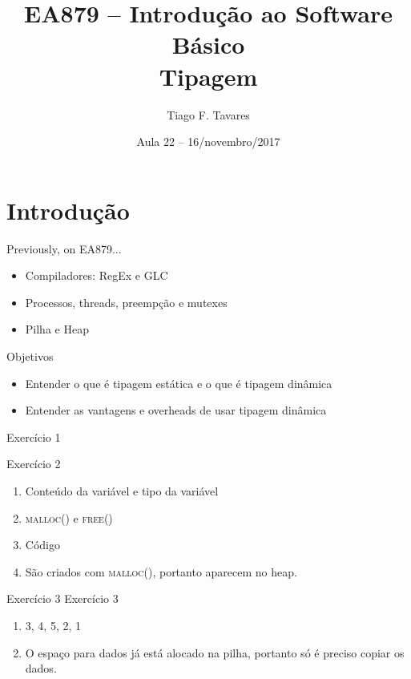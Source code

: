 \documentclass{beamer}
\title[22-Tipagem]{EA879 -- Introdução ao Software
Básico\\Tipagem}
\author{Tiago F. Tavares}
\institute{FEEC -- UNICAMP}
\date{Aula 22 -- 16/novembro/2017}
\begin{document}
\begin{frame}
  \titlepage
\end{frame}


\section{Introdução}

\begin{frame}[fragile]{Previously, on EA879...}
  \centering
  \Large
  \begin{itemize}
    \item Compiladores: RegEx e GLC
    \item Processos, threads, preempção e mutexes
    \item Pilha e Heap
  \end{itemize}
\end{frame}

\begin{frame}{Objetivos}
  \Large
  \begin{itemize}
    \item Entender o que é tipagem estática e o que é tipagem dinâmica
    \item Entender as vantagens e overheads de usar tipagem dinâmica
  \end{itemize}
\end{frame}



\begin{frame}[fragile]{Exercício 1}
  \centering
  \Large
\end{frame}

\begin{frame}[fragile]{Exercício 2}
  \centering
  \Large
  \begin{enumerate}
    \item <2-> Conteúdo da variável e tipo da variável
    \item <3-> \textsc{malloc()} e \textsc{free()}
    \item <4-> Código
    \item <5-> São criados com \textsc{malloc()}, portanto aparecem no heap.
  \end{enumerate}
\end{frame}

\begin{frame}[fragile]{Exercício 3}
  \centering
  \Large
  Exercício 3
  \begin{enumerate}
    \item <2-> 3, 4, 5, 2, 1
    \item <3-> O espaço para dados já está alocado na pilha, portanto só é
      preciso copiar os dados.
  \end{enumerate}
\end{frame}
\end{document}

